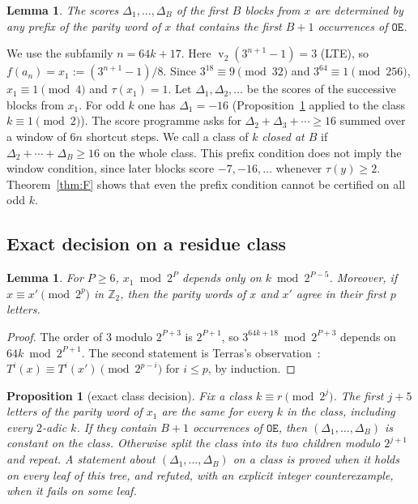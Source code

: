 \documentclass[11pt]{article}
\newtheorem{lemma}[theorem]{Lemma}
\newtheorem{proposition}[theorem]{Proposition}
\theoremstyle{definition}
\theoremstyle{remark}
\newcommand{\Z}{\mathbb{Z}}
\DeclareMathOperator{\vv}{v}
\begin{document}
\begin{lemma}\label{lem:blockword}
The scores $\Delta_1,\dots,\Delta_B$ of the first $B$ blocks from $x$
are determined by any prefix of the parity word of $x$ that contains
the first $B+1$ occurrences of $\mathtt{OE}$.
\end{lemma}

We use the subfamily $n=64k+17$. Here $\vv_2(3^{n+1}-1)=3$ (LTE), so
$f(a_n)=x_1:=(3^{n+1}-1)/8$. Since $3^{18}\equiv9\pmod{32}$ and
$3^{64}\equiv1\pmod{256}$, $x_1\equiv1\pmod4$ and $\tau(x_1)=1$. Let
$\Delta_1,\Delta_2,\dots$ be the scores of the successive blocks from
$x_1$. For odd $k$ one has $\Delta_1=-16$ (Proposition~\ref{prop:decide}
applied to the class $k\equiv1\pmod2$). The score programme asks for
$\Delta_2+\Delta_3+\cdots\ge16$ summed over a window of $6n$ shortcut
steps. We call a class of $k$ \emph{closed at $B$} if
$\Delta_2+\cdots+\Delta_B\ge16$ on the whole class. This prefix
condition does not imply the window condition, since later blocks score
$-7,-16,\dots$ whenever $\tau(y)\ge2$. Theorem~\ref{thm:F} shows that
even the prefix condition cannot be certified on all odd $k$.

\subsection*{Exact decision on a residue class}

\begin{lemma}\label{lem:determinacy}
For $P\ge6$, $x_1\bmod2^{P}$ depends only on $k\bmod2^{P-5}$.
Moreover, if $x\equiv x'\pmod{2^{p}}$ in $\Z_2$, then the parity words
of $x$ and $x'$ agree in their first $p$ letters.
\end{lemma}

\begin{proof}
The order of $3$ modulo $2^{P+3}$ is $2^{P+1}$, so
$3^{64k+18}\bmod2^{P+3}$ depends on $64k\bmod2^{P+1}$. The second
statement is Terras's observation~\cite{Terras1976}: $T^{i}(x)\equiv
T^{i}(x')\pmod{2^{p-i}}$ for $i\le p$, by induction.
\end{proof}

\begin{proposition}[exact class decision]\label{prop:decide}
Fix a class $k\equiv r\pmod{2^{j}}$. The first $j+5$ letters of the
parity word of $x_1$ are the same for every $k$ in the class, including
every $2$-adic $k$. If they contain $B+1$ occurrences of $\mathtt{OE}$,
then $(\Delta_1,\dots,\Delta_B)$ is constant on the class. Otherwise
split the class into its two children modulo $2^{j+1}$ and repeat. A
statement about $(\Delta_1,\dots,\Delta_B)$ on a class is proved when it
holds on every leaf of this tree, and refuted, with an explicit integer
counterexample, when it fails on some leaf.
\end{proposition}
\end{document}
